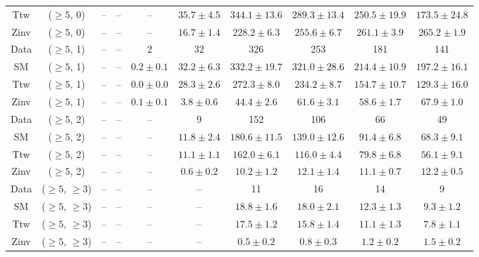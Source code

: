 \begin{table}[h!]
{\begin{tabular}{cccccccccc}
	Ttw & ($\ge5$, 0) & -- & -- & -- & $35.7\pm 4.5$ & $344.1\pm 13.6$ & $289.3\pm 13.4$ & $250.5\pm 19.9$ & $173.5\pm 24.8$ \\[0.5ex] 
	Zinv & ($\ge5$, 0) & -- & -- & -- & $16.7\pm 1.4$ & $228.2\pm 6.3$ & $255.6\pm 6.7$ & $261.1\pm 3.9$ & $265.2\pm 1.9$ \\[0.5ex] 
	Data & ($\ge5$, 1) & -- & -- & 2 & 32 & 326 & 253 & 181 & 141 \\[0.5ex] 
	SM & ($\ge5$, 1) & -- & -- & $0.2\pm 0.1$ & $32.2\pm 6.3$ & $332.2\pm 19.7$ & $321.0\pm 28.6$ & $214.4\pm 10.9$ & $197.2\pm 16.1$ \\[0.5ex] 
	Ttw & ($\ge5$, 1) & -- & -- & $0.0\pm 0.0$ & $28.3\pm 2.6$ & $272.3\pm 8.0$ & $234.2\pm 8.7$ & $154.7\pm 10.7$ & $129.3\pm 16.0$ \\[0.5ex] 
	Zinv & ($\ge5$, 1) & -- & -- & $0.1\pm 0.1$ & $3.8\pm 0.6$ & $44.4\pm 2.6$ & $61.6\pm 3.1$ & $58.6\pm 1.7$ & $67.9\pm 1.0$ \\[0.5ex] 
	Data & ($\ge5$, 2) & -- & -- & -- & 9 & 152 & 106 & 66 & 49 \\[0.5ex] 
	SM & ($\ge5$, 2) & -- & -- & -- & $11.8\pm 2.4$ & $180.6\pm 11.5$ & $139.0\pm 12.6$ & $91.4\pm 6.8$ & $68.3\pm 9.1$ \\[0.5ex] 
	Ttw & ($\ge5$, 2) & -- & -- & -- & $11.1\pm 1.1$ & $162.0\pm 6.1$ & $116.0\pm 4.4$ & $79.8\pm 6.8$ & $56.1\pm 9.1$ \\[0.5ex] 
	Zinv & ($\ge5$, 2) & -- & -- & -- & $0.6\pm 0.2$ & $10.2\pm 1.2$ & $12.1\pm 1.4$ & $11.1\pm 0.7$ & $12.2\pm 0.5$ \\[0.5ex] 
	Data & ($\ge5$, $\ge3$) & -- & -- & -- & -- & 11 & 16 & 14 & 9 \\[0.5ex] 
	SM & ($\ge5$, $\ge3$) & -- & -- & -- & -- & $18.8\pm 1.6$ & $18.0\pm 2.1$ & $12.3\pm 1.3$ & $9.3\pm 1.2$ \\[0.5ex] 
	Ttw & ($\ge5$, $\ge3$) & -- & -- & -- & -- & $17.5\pm 1.2$ & $15.8\pm 1.4$ & $11.1\pm 1.3$ & $7.8\pm 1.1$ \\[0.5ex] 
	Zinv & ($\ge5$, $\ge3$) & -- & -- & -- & -- & $0.5\pm 0.2$ & $0.8\pm 0.3$ & $1.2\pm 0.2$ & $1.5\pm 0.2$ \\[0.5ex] 
	\hline
	\hline
\end{tabular}}
\end{table}

